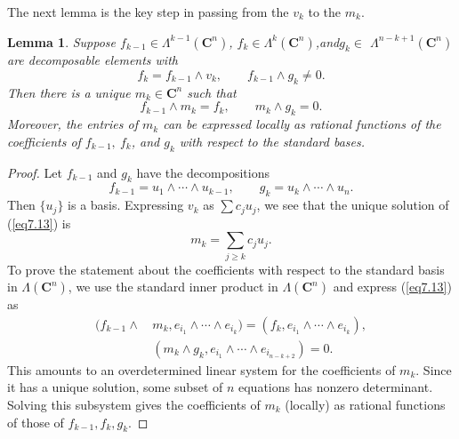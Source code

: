 \documentclass{surv-l}
\theoremstyle{plain}
\newtheorem{lemma}[theorem]{Lemma}
\theoremstyle{definition}
\numberwithin{equation}{chapter}
\begin{document}
The next lemma is the key step in passing from the $v_{k}$ to the $m_{k}$.
\setcounter{theorem}{10}
\begin{lemma}\label{chap01:lem7.11}
Suppose $f_{k-1} \in\Lambda^{k-1}(\mathbf{C}^{n})$, $f_{k} \in\Lambda^{k}(\mathbf{C}^{n})$,\quad and\quad $g_{k} \in$ $\Lambda^{n-k+1}(\mathbf{C}^{n})$ are decomposable elements with
\setcounter{equation}{11}
\begin{equation}\label{eq7.12}
f_{k}=f_{k-1}\wedge v_{k},\qquad f_{k-1}\wedge g_{k}\neq 0.
\end{equation}
Then there is a unique $m_{k}\in \mathbf{C}^{n}$ such that
\begin{equation}\label{eq7.13}
f_{k-1}\wedge m_{k}=f_{k},\qquad m_{k}\wedge g_{k}=0.
\end{equation}
Moreover, the entries of $m_{k}$ can be expressed locally as rational functions of the coefficients of $f_{k-1},\ f_{k}$, and $g_{k}$ with respect to the standard bases.
\end{lemma}
\begin{proof}
Let $f_{k-1}$ and $g_{k}$ have the decompositions
\begin{equation*}
 f_{k-1}=u_{1}\wedge\cdots\wedge u_{k-1},\qquad  g_{k}=u_{k}\wedge\cdots\wedge u_{n}.
\end{equation*}
Then $\{u_{j}\}$ is a basis. Expressing $v_{k}$ as $\sum c_{j}u_{j}$, we see that the unique solution of (\ref{eq7.13}) is
\begin{equation*}
m_{k}=\displaystyle\sum_{j\geq k}c_{j}u_{j}.
\end{equation*}
To prove the statement about the coefficients with respect to the standard basis in $\Lambda(\mathbf{C}^{n})$, we use the standard inner product in $\Lambda(\mathbf{C}^{n})$ and express (\ref{eq7.13}) as
\begin{align}\label{eq7.14}
(f_{k-1}\wedge\, &m_{k}, e_{i_{1}}\wedge\cdots\wedge e_{i_{k}})=(f_{k}, e_{i_{1}}\wedge\cdots\wedge e_{i_{k}}),\\
&(m_{k}\wedge g_{k}, e_{i_{1}}\wedge\cdots\wedge e_{i_{n-k+2}})=0.\nonumber
\end{align}
This amounts to an overdetermined linear system for the coefficients of $m_{k}$. Since it has a unique solution, some subset of $n$ equations has nonzero determinant. Solving this subsystem gives the coefficients of $m_{k}$ (locally) as rational functions of those of $f_{k-1}, f_{k}, g_{k}$.
\end{proof}
\setcounter{theorem}{14}
\end{document}

